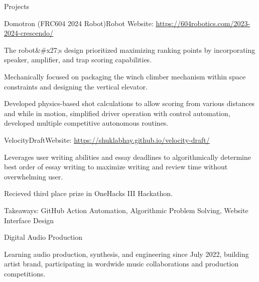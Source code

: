 \documentclass[
  11pt, %
]{public/resume/resume} %
\begin{document}
\begin{rSection}{Projects}
\begin{rSubsection}{Quickscout}{}
{  \end{rSubsection}
      
  \begin{rSubsection}{Domotron (FRC604 2024 Robot)}{}{Robot Website: \underline{\href{https://604robotics.com/2023-2024-crescendo/}{https://604robotics.com/2023-2024-crescendo/}}}{}
       
    \item The robot&#x27;s design prioritized maximizing ranking points by incorporating speaker, amplifier, and trap scoring capabilities.
        
    \item Mechanically focused on packaging the winch climber mechanism within space constraints and designing the vertical elevator.
        
    \item Developed physics-based shot calculations to allow scoring from various distances and while in motion, simplified driver operation with control automation, developed multiple competitive autonomous routines.
        
  \end{rSubsection}
      
  \begin{rSubsection}{VelocityDraft}{}{Website: \underline{\href{https://shuklabhay.github.io/velocity-draft/}{https://shuklabhay.github.io/velocity-draft/}}}{}
       
    \item Leverages user writing abilities and essay deadlines to algorithmically determine best order of essay writing to maximize writing and review time without overwhelming user.
        
    \item Recieved third place prize in OneHacks III Hackathon.
        
    \item Takeaways: GitHub Action Automation, Algorithmic Problem Solving, Website Interface Design
        
  \end{rSubsection}
      
  \begin{rSubsection}{Digital Audio Production}{}{\underline{}{}
       
    \item Learning audio production, synthesis, and engineering since July 2022, building artist brand, participating in wordwide music collaborations and production competitions.
        
}
\end{rSubsection}
\end{rSection}
\end{document}
